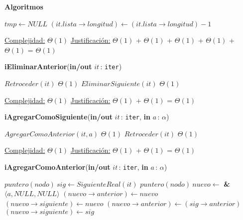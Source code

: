 \documentclass[a4paper,10pt]{article}
\let\TipoVariable=\texttt
\let\ModificadorArgumento=\textbf
\newcommand{\In}[2]{\ModificadorArgumento{in} \ensuremath{#1}\,: \TipoVariable{#2}\xspace}
\newcommand{\Inout}[2]{\ModificadorArgumento{in/out} \ensuremath{#1}\,: \TipoVariable{#2}\xspace}
\newenvironment{Algoritmos}{%
  \vspace*{2ex}%
  \noindent\textbf{\Large Algoritmos}%
  \vspace*{2ex}%
}{}
\begin{document}
\begin{Algoritmos}
\begin{algorithm}[H]
\begin{algorithmic}[1]
			\State $tmp \gets NULL$	 
			\State $(it.lista\rightarrow longitud) \gets (it.lista\rightarrow longitud) - 1$

			\medskip
			\Statex \underline{Complejidad:} $\Theta(1)$
			\Statex \underline{Justificación:} $\Theta(1)$ + $\Theta(1)$ + $\Theta(1)$ + $\Theta(1)$ + $\Theta(1)$ =  $\Theta(1)$
    	\end{algorithmic}
\end{algorithm}

	
\begin{algorithm}[H]
	\begin{algorithmic}[1]
		\State \textbf{iEliminarAnterior}(\Inout{it}{iter})
		
			\State $Retroceder(it)$	\Comment $\Theta(1)$
			\State $EliminarSiguiente(it)$	\Comment $\Theta(1)$

			\medskip
			\Statex \underline{Complejidad:} $\Theta(1)$
			\Statex \underline{Justificación:} $\Theta(1)$ + $\Theta(1)$ = $\Theta(1)$
    	\end{algorithmic}
\end{algorithm}


\begin{algorithm}[H]
	\begin{algorithmic}[1]
		\State \textbf{iAgregarComoSiguiente}(\Inout{it}{iter}, \In{a}{$\alpha$})
		
			\State $AgregarComoAnterior(it, a)$		\Comment $\Theta(1)$
			\State $Retroceder(it)$	\Comment $\Theta(1)$

			\medskip
			\Statex \underline{Complejidad:} $\Theta(1)$
			\Statex \underline{Justificación:} $\Theta(1)$ + $\Theta(1)$ = $\Theta(1)$
    	\end{algorithmic}
\end{algorithm}
	

\begin{algorithm}[H]
	\begin{algorithmic}[1]
		\State \textbf{iAgregarComoAnterior}(\Inout{it}{iter}, \In{a}{$\alpha$})
		
			\State $puntero(nodo) \ sig \gets SiguienteReal(it)$
			\State $puntero(nodo) \ nuevo \gets $ \textbf{\&} $\langle a, NULL, NULL \rangle$ 
				\State $(nuevo\rightarrow anterior) \gets nuevo$
				\State $(nuevo\rightarrow siguiente) \gets nuevo$
			\Else
				\State $(nuevo\rightarrow anterior) \gets (sig\rightarrow anterior)$
				\State $(nuevo\rightarrow siguiente) \gets sig$
			\EndIf
			

\end{algorithmic}
\end{algorithm}
\end{Algoritmos}
\end{document}
